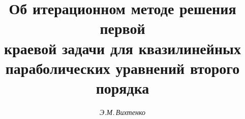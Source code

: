 









\newcommand{\tts}[1]{}










\setcounter{page}{20}












\author{\it Э.М.\,Вихтенко}




\title{Об итерационном методе решения первой\\


краевой задачи для квазилинейных\\


параболических уравнений второго порядка}







\date{}







\pagestyle{plain} %













